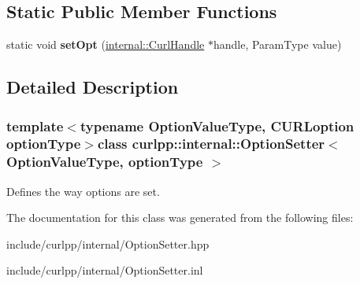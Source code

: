 \subsection*{Static Public Member Functions}
\begin{DoxyCompactItemize}
\item 
\hypertarget{classcurlpp_1_1internal_1_1OptionSetter_ac93047cc63b6714ba44469d391a19d11}{static void {\bfseries set\-Opt} (\hyperlink{classcurlpp_1_1internal_1_1CurlHandle}{internal\-::\-Curl\-Handle} $\ast$handle, Param\-Type value)}\label{classcurlpp_1_1internal_1_1OptionSetter_ac93047cc63b6714ba44469d391a19d11}

\end{DoxyCompactItemize}


\subsection{Detailed Description}
\subsubsection*{template$<$typename Option\-Value\-Type, C\-U\-R\-Loption option\-Type$>$class curlpp\-::internal\-::\-Option\-Setter$<$ Option\-Value\-Type, option\-Type $>$}

Defines the way options are set. 

The documentation for this class was generated from the following files\-:\begin{DoxyCompactItemize}
\item 
include/curlpp/internal/Option\-Setter.\-hpp\item 
include/curlpp/internal/Option\-Setter.\-inl\end{DoxyCompactItemize}
